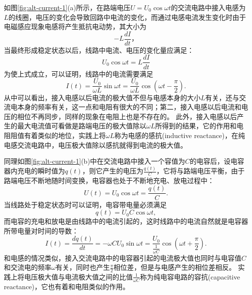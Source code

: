如图\ref{fig:alt-current-1}(a)所示，在路端电压$U = U_0\cos\omega t$的交流电路中接入电感为$L$的线圈，电压的变化会导致回路中电流的变化，而通过电感电流发生变化时由于电磁感应现象电感将产生抵抗电动势，其大小为
\begin{equation}
-L\frac{dI}{dt}，
\end{equation}
当最终形成稳定状态以后，线路中电流、电压的变化量应满足：
\begin{equation}
U_0\cos\omega t = L\frac{dI}{dt}
\end{equation}
为使上式成立，可以证明，线路中的电流需要满足
\begin{equation}
I(t) = \frac{U_0}{\omega L}\sin\omega t = \frac{U_0}{\omega L}\cos(\omega t - \frac{\pi}{2}).
\end{equation}
从中可以看出，接入电感以后电流的极大值不但与电感本身的大小$L$有关，还与交流电本身的频率有关，这一点和电阻有很大的不同；第二，接入电感以后电流和电压的相位不再同步，同样的现象在电阻上也是不存在的。
此外，接入电感以后产生的最大电流值可看做是路端电压的极大值除以$\omega L$所得到的结果，它的作用和电阻阻值有着类似的地位，实践上将$\omega L$称为电感的{\heiti 感抗}(inductive reactance)，在纯电感交流电路中，电压极大值除以感抗就得到电流的极大值。


同理如图\ref{fig:alt-current-1}(b)中在交流电路中接入一个容值为$C$的电容后，设电容器内充电的瞬时值为$q(t)$，则它产生的电压为$\frac{q(t)}{C}$，它将与路端电压平衡，由于路端电压不断地随时间变换，电容器也处于不断地充电、放电过程中：
\begin{equation}
U(t) = U_0\cos\omega t = \frac{q(t)}{C}.
\end{equation}
当线路处于稳定状态时可以证明，电容带电量必须满足
\begin{equation}
q(t) = U_0 C \cos\omega t,
\end{equation}
而电容的充电和放电是由线路中的电流引起的，这时线路中的电流自然就是电容器所带电量对时间的导数：
\begin{equation}
I(t) = \frac{dq(t)}{dt} = - \omega C U_0\sin\omega t = \frac{U_0}{\frac{1}{\omega C}}\cos(\omega t+\frac{\pi}{2}).
\end{equation}
和电感的情况类似，接入交流电路中的电容器引起的电流极大值也同时与电容值$C$和交流电的频率$\omega$有关，同时也产生$\frac{\pi}{2}$相位差，但是与电感产生的相位差相反。
实践上将电压极大值与电流极大值之间的比值$\frac{1}{\omega C}$称为纯电容电路的{\heiti 容抗}(capacitive reactance)，它也有着和电阻类似的作用。


